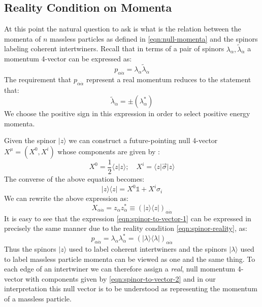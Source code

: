 \documentclass[twocolumn,final,aps,nofootinbib,nobibnotes]{revtex4-2}
\newcommand{\id}{\mathbb{1}}
\newcommand{\innerp}[2]{\langle #1 \vert #2 \rangle}
\newcommand{\expectop}[3]{\langle #1 \vert #2 \vert #3 \rangle}
\newcommand{\bra}[1]{\langle #1 \vert}
\newcommand{\ket}[1]{\vert #1 \rangle}
\newcommand{\onehalf}{\frac{1}{2}}
\begin{document}
\subsection{Reality Condition on Momenta}\label{sec:reality-condition}

At this point the natural question to ask is what is the relation between the momenta of $ n $ massless particles as defined in \eqref{eqn:null-momenta} and the spinors labeling coherent intertwiners. Recall that in terms of a pair of spinors $ \lambda_\alpha, \tilde \lambda_{\dot \alpha} $ a momentum 4-vector can be expressed as:
\begin{equation}\label{eqn:spinor-to-vector-1}
	p_{\alpha \dot \alpha} = \lambda_\alpha \tilde \lambda_{\dot \alpha}	
\end{equation}
The requirement that $ p_{\alpha \dot \alpha} $ represent a real momentum reduces to the statement that:
\begin{equation}\label{eqn:spinor-reality}
	\tilde \lambda_{\dot \alpha} = \pm (\lambda^*_\alpha)	
\end{equation}
We choose the positive sign in this expression in order to select positive energy momenta.

Given the spinor $ \ket{z} $ we can construct a future-pointing null 4-vector $ X^\mu = (X^0, X^i)$ whose components are given by \cite{Freidel2010From}:
\begin{equation}\label{eqn:spinor-to-vector-2}
	X^0 = \onehalf \innerp{z}{z}; \quad X^i = \expectop{z}{\vec \sigma}{z}
\end{equation}
The converse of the above equation becomes:
\begin{equation}\label{eqn:vector-to-spinor-1}
	\ket{z}\bra{z} = X^0 \id + X^i \sigma_i
\end{equation}
We can rewrite the above expression as:
\begin{equation}\label{eqn:spinor-to-vector-3}
	X_{\alpha \dot \alpha} = z_\alpha z^*_{\dot \alpha} \equiv (\ket{z}\bra{z})_{\alpha \dot \alpha}
\end{equation}
It is easy to see that the expression \eqref{eqn:spinor-to-vector-1} can be expressed in precisely the same manner due to the reality condition \eqref{eqn:spinor-reality}, as:
\begin{equation}\label{eqn:spinor-to-vector-4}
	p_{\alpha \dot \alpha} = \lambda_\alpha \lambda^*_{\dot \alpha} = (\ket{\lambda}\bra{\lambda})_{\alpha \dot \alpha}
\end{equation}
Thus the spinors $ \ket{z} $ used to label coherent intertwiners and the spinors $ \ket{\lambda} $ used to label massless particle momenta can be viewed as one and the same thing. To each edge of an intertwiner we can therefore assign a \textit{real}, null momentum 4-vector with components given by \eqref{eqn:spinor-to-vector-2} and in our interpretation this null vector is to be understood as representing the momentum of a massless particle.
\end{document}
